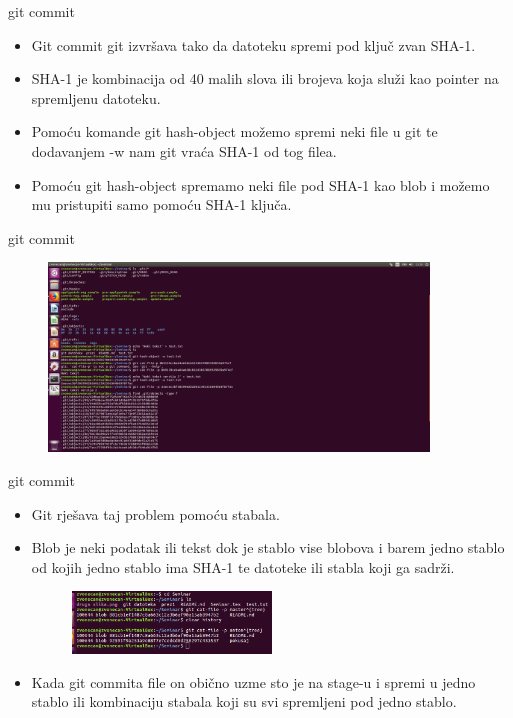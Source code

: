 \documentclass{beamer}
\begin{document}
\begin{frame}{git commit}

\begin{itemize}
	\setlength\itemsep{2.5em}
	\item Git commit git izvršava tako da datoteku spremi pod ključ zvan SHA-1.
	\item SHA-1 je kombinacija od 40 malih slova ili brojeva koja služi kao pointer na spremljenu datoteku.
	\item Pomoću komande git hash-object možemo spremi neki file u git te dodavanjem -w nam git vraća SHA-1 od tog filea.
	\item Pomoću git hash-object spremamo neki file pod SHA-1 kao blob i možemo mu pristupiti samo pomoću SHA-1 ključa.
\end{itemize}

\end{frame}

\begin{frame}{git commit}
\begin{figure}
\centering
\includegraphics[width=0.9\textwidth]{./slike/druga_slika.png}
\end{figure}

\end{frame}

\begin{frame}{git commit}

\begin{itemize}
	\item Git rješava taj problem pomoću stabala.
	\item Blob je neki podatak ili tekst dok je stablo vise blobova i barem jedno stablo od kojih jedno stablo ima SHA-1 te datoteke ili stabla koji ga sadrži.
	\begin{figure}
		\centering
	\includegraphics[width=0.5\textwidth]{./slike/treca_slika.jpg}
	\end{figure}
	\item Kada git commita file on obično uzme sto je na stage-u i spremi u jedno stablo ili kombinaciju stabala koji su svi spremljeni pod jedno stablo.
\end{itemize}
\end{frame}
\end{document}
